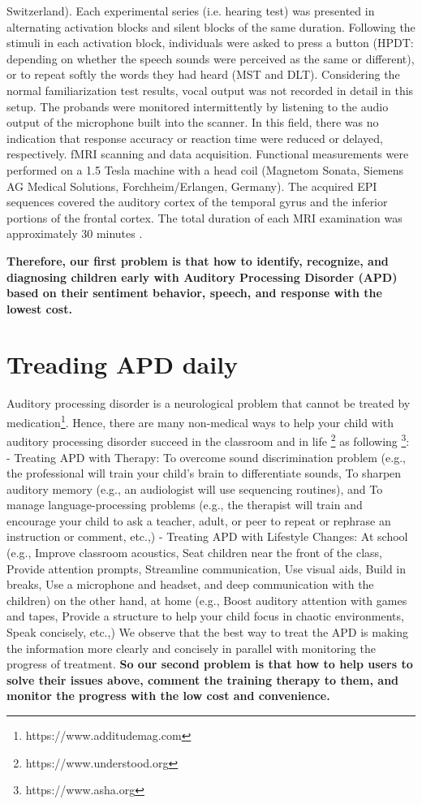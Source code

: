 \documentclass[letterpaper%
, twoside%
, 12pt%
,these%
, english%
,creativecommons,hyperref%
]{thETS}
\begin{document}
Switzerland). Each experimental series (i.e. hearing
test) was presented in alternating activation blocks and silent blocks of the same duration.
Following the stimuli in each activation block, individuals were asked to press a button (HPDT:
depending on whether the speech sounds were perceived as the same or different), or to repeat
softly the words they had heard (MST and DLT). Considering the normal familiarization test
results, vocal output was not recorded in detail in this setup. The probands were monitored
intermittently by listening to the audio output of the microphone built into the scanner. In this
field, there was no indication that response accuracy or reaction time were reduced or delayed,
respectively. fMRI scanning and data acquisition. Functional measurements were performed
on a 1.5 Tesla machine with a head coil (Magnetom Sonata, Siemens AG Medical Solutions,
Forchheim/Erlangen, Germany). The acquired EPI sequences covered the auditory cortex of
the temporal gyrus and the inferior portions of the frontal cortex. The total duration of each
MRI examination was approximately 30 minutes {\cite{-Friedrich}}.

\textbf{Therefore, our first problem is that how to identify, recognize, and diagnosing children
early with Auditory Processing Disorder (APD) based on their sentiment behavior, speech,
and response with the lowest cost.}
\section{Treading APD daily}
Auditory processing disorder is a neurological problem that cannot be treated by medication\footnote{https://www.additudemag.com}.
Hence, there are many non-medical ways to help your child with auditory processing disorder
succeed in the classroom and in life \footnote{https://www.understood.org} as following \footnote{https://www.asha.org}:
- Treating APD with Therapy: To overcome sound discrimination problem (e.g., the professional
will train your child’s brain to differentiate sounds, To sharpen auditory memory
(e.g., an audiologist will use sequencing routines), and To manage language-processing
problems (e.g., the therapist will train and encourage your child to ask a teacher, adult, or
peer to repeat or rephrase an instruction or comment, etc.,)
- Treating APD with Lifestyle Changes: At school (e.g., Improve classroom acoustics, Seat
children near the front of the class, Provide attention prompts, Streamline communication,
Use visual aids, Build in breaks, Use a microphone and headset, and deep communication
with the children) on the other hand, at home (e.g., Boost auditory attention with games and
tapes, Provide a structure to help your child focus in chaotic environments, Speak concisely,
etc.,)
We observe that the best way to treat the APD is making the information more clearly and
concisely in parallel with monitoring the progress of treatment. \textbf{So our second problem is
that how to help users to solve their issues above, comment the training therapy to them,
and monitor the progress with the low cost and convenience.}
\end{document}
